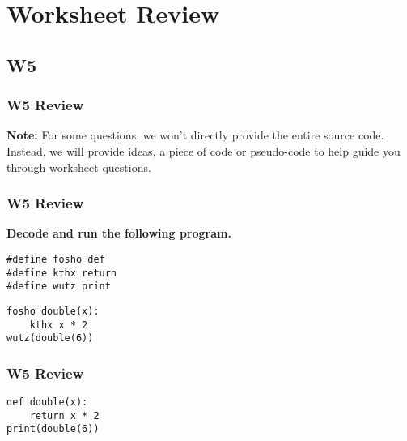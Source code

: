 \documentclass[
	11pt, %
]{beamer}
\begin{document}














\section{Worksheet Review}

\subsection{W5}
\frametitle{W5 Review}
\begin{frame}
	\textbf{Note:} For some questions, we won't directly provide the entire source code.
    Instead, we will provide ideas, a piece of code or pseudo-code to help guide you through worksheet questions.
\end{frame}


\begin{frame}
    \frametitle{W5 Review}
    \textbf{Decode and run the following program.}
    \vspace{0.5em}

    \texttt{\#define fosho def} \\
    \texttt{\#define kthx return} \\
    \texttt{\#define wutz print} \\

	\bigskip

    \texttt{fosho double(x):} \\
    \texttt{\ \ \ \ kthx x * 2} \\

    \texttt{wutz(double(6))}
\end{frame}


\begin{frame}
    \frametitle{W5 Review}
    \texttt{def double(x):} \\
    \texttt{~~~~return x * 2} \\

    \texttt{print(double(6))}
\end{frame}
\end{document}
